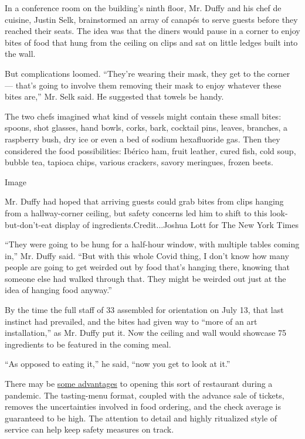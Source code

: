 In a conference room on the building's ninth floor, Mr. Duffy and his
chef de cuisine, Justin Selk, brainstormed an array of canapés to serve
guests before they reached their seats. The idea was that the diners
would pause in a corner to enjoy bites of food that hung from the
ceiling on clips and sat on little ledges built into the wall.

But complications loomed. ``They're wearing their mask, they get to the
corner --- that's going to involve them removing their mask to enjoy
whatever these bites are,'' Mr. Selk said. He suggested that towels be
handy.

The two chefs imagined what kind of vessels might contain these small
bites: spoons, shot glasses, hand bowls, corks, bark, cocktail pins,
leaves, branches, a raspberry bush, dry ice or even a bed of sodium
hexafluoride gas. Then they considered the food possibilities: Ibérico
ham, fruit leather, cured fish, cold soup, bubble tea, tapioca chips,
various crackers, savory meringues, frozen beets.

Image

Mr. Duffy had hoped that arriving guests could grab bites from clips
hanging from a hallway-corner ceiling, but safety concerns led him to
shift to this look-but-don't-eat display of ingredients.Credit...Joshua
Lott for The New York Times

``They were going to be hung for a half-hour window, with multiple
tables coming in,'' Mr. Duffy said. ``But with this whole Covid thing, I
don't know how many people are going to get weirded out by food that's
hanging there, knowing that someone else had walked through that. They
might be weirded out just at the idea of hanging food anyway.''

By the time the full staff of 33 assembled for orientation on July 13,
that last instinct had prevailed, and the bites had given way to ``more
of an art installation,'' as Mr. Duffy put it. Now the ceiling and wall
would showcase 75 ingredients to be featured in the coming meal.

``As opposed to eating it,'' he said, ``now you get to look at it.''

There may be
\href{https://www.nytimes3xbfgragh.onion/2020/07/28/dining/melbourne-restaurants-coronavirus.html}{some
advantages} to opening this sort of restaurant during a pandemic. The
tasting-menu format, coupled with the advance sale of tickets, removes
the uncertainties involved in food ordering, and the check average is
guaranteed to be high. The attention to detail and highly ritualized
style of service can help keep safety measures on track.

